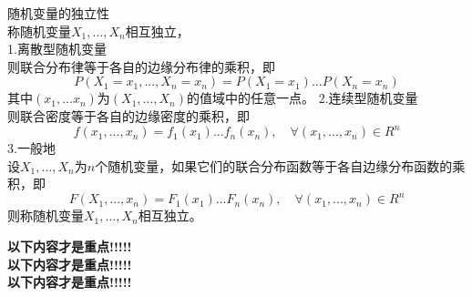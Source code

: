 \begin{definition}
  随机变量的独立性\\
  称随机变量$X_1, ...,X_n$相互独立，\\
  1.离散型随机变量\\
     则联合分布律等于各自的边缘分布律的乘积，即
     $$
     P(X_1=x_1,...,X_n=x_n)=P(X_1=x_1)...P(X_n=x_n)
     $$
     其中$(x_1,...x_n)$为$(X_1,...,X_n)$的值域中的任意一点。
  2.连续型随机变量\\
     则联合密度等于各自的边缘密度的乘积，即
     $$
     f(x_1,...,x_n)=f_1(x_1)...f_n(x_n),\quad \forall(x_1,...,x_n)\in R ^n
     $$
   3.一般地\\
     设$X_1,...,X_n$为$n$个随机变量，如果它们的联合分布函数等于各自边缘分布函数的乘积，即
     $$
     F(X_1, ...,x_n)=F_1(x_1)...F_n(x_n),\quad \forall (x_1,...,x_n)\in R^n
     $$
     则称随机变量$X_1, ...,X_n$相互独立。
\end{definition}

\textbf{以下内容才是重点!!!!!}\\
\textbf{以下内容才是重点!!!!!}\\
\textbf{以下内容才是重点!!!!!}\\

